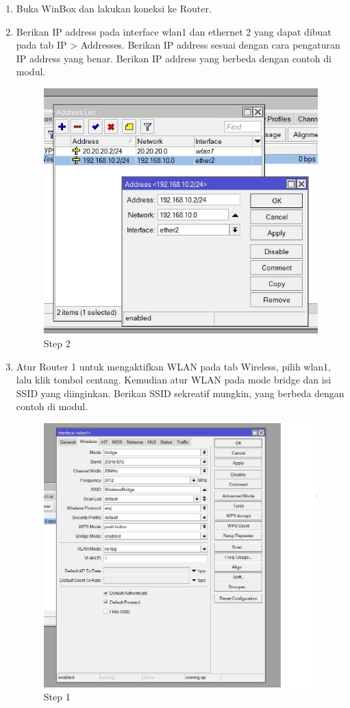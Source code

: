\begin{enumerate}
	\item Buka WinBox dan lakukan koneksi ke Router.

	\item Berikan IP address pada interface wlan1 dan ethernet 2 yang dapat dibuat pada tab IP > Addresses. Berikan IP address sesuai dengan cara pengaturan IP address yang benar. Berikan IP
	address yang berbeda dengan contoh di modul.
	\begin{figure}[H]
		\centering
		\includegraphics[width=0.5\linewidth]{P1/img/per3pc1step2.jpg}
		\caption{Step 2}
		\label{fig:gambar17}
	\end{figure}

	\item Atur Router 1 untuk mengaktifkan WLAN pada tab Wireless, pilih wlan1, lalu klik tombol centang.
	Kemudian atur WLAN pada mode bridge dan isi SSID yang diinginkan. Berikan SSID sekreatif
	mungkin, yang berbeda dengan contoh di modul.
	
	\begin{figure}[H]
		\centering
		\includegraphics[width=0.5\linewidth]{P1/img/per3pc1step3.jpg}
		\caption{Step 1}
		\label{fig:gambar18}
	\end{figure}


\end{enumerate}
